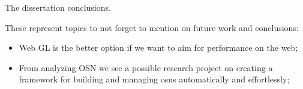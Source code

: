 The dissertation conclusions.

These represent topics to not forget to mention on future work and conclusions:
\begin{itemize}
    \item Web GL is the better option if we want to aim for performance on the web;
    \item From analyzing OSN we see a possible research project on creating a framework for building
    and managing \glspl{osn} automatically and effortlessly;
\end{itemize}